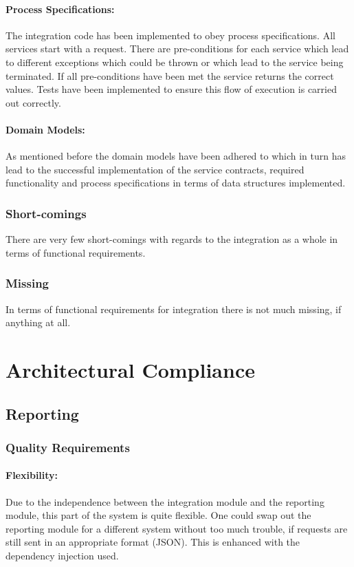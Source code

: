 \documentclass{article}
\begin{document}
			\paragraph{Process Specifications:}
			The integration code has been implemented to obey process specifications. 
			All services start with a request. There are pre-conditions for each service which lead to different exceptions which could be thrown or which lead to the service being terminated.
			If all pre-conditions have been met the service returns the correct values. Tests have been implemented to ensure this flow of execution is carried out correctly.
			\paragraph{Domain Models:}
			As mentioned before the domain models have been adhered to which in turn has lead to the successful implementation of the service contracts, required functionality and process specifications in terms of data structures implemented.
		\subsubsection{Short-comings}
			There are very few short-comings with regards to the integration as a whole in terms of functional requirements.
		\subsubsection{Missing}
			In terms of functional requirements for integration there is not much missing, if anything at all.
\section{Architectural Compliance}
    \subsection{Reporting}
        \subsubsection{Quality Requirements}
            \paragraph{Flexibility:}
            Due to the independence between the integration module and the reporting module, this part of the system is quite flexible. One could swap out the reporting module for a different system without too much trouble, if requests are still sent in an appropriate format (JSON). This is enhanced with the dependency injection used.
\end{document}
